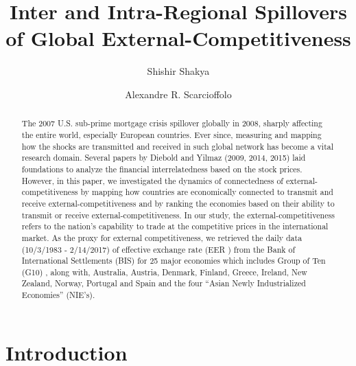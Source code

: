 \documentclass[]{elsarticle} %
\begin{document}
\begin{frontmatter}

  \title{Inter and Intra-Regional Spillovers of Global External-Competitiveness}
    \author[West Virginia University]{Shishir Shakya}
    \author[West Virginia University]{Alexandre R. Scarcioffolo}
  
      \address[West Virginia University]{College of Business and Economics \& Regional Research Institute (RRI),
West Virginia University}
    \address[Another University]{Davis College of Agriculture, Natural Resources and Design \& Regional
Research Institute (RRI), West Virginia University}
  
  \begin{abstract}
  The 2007 U.S. sub-prime mortgage crisis spillover globally in 2008,
  sharply affecting the entire world, especially European countries. Ever
  since, measuring and mapping how the shocks are transmitted and received
  in such global network has become a vital research domain. Several
  papers by Diebold and Yilmaz (2009, 2014, 2015) laid foundations to
  analyze the financial interrelatedness based on the stock prices.
  However, in this paper, we investigated the dynamics of connectedness of
  external-competitiveness by mapping how countries are economically
  connected to transmit and receive external-competitiveness and by
  ranking the economies based on their ability to transmit or receive
  external-competitiveness. In our study, the external-competitiveness
  refers to the nation's capability to trade at the competitive prices in
  the international market. As the proxy for external competitiveness, we
  retrieved the daily data (10/3/1983 - 2/14/2017) of effective exchange
  rate (EER ) from the Bank of International Settlements (BIS) for 25
  major economies which includes Group of Ten (G10) , along with,
  Australia, Austria, Denmark, Finland, Greece, Ireland, New Zealand,
  Norway, Portugal and Spain and the four ``Asian Newly Industrialized
  Economies'' (NIE's).
  \end{abstract}
  
 \end{frontmatter}

\section{Introduction}\label{introduction}
\end{document}
